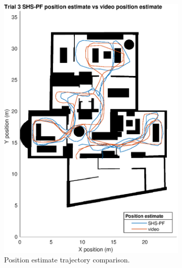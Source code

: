  \begin{figure}[H]
 	\centering
 	\begin{subfigure}[t]{.45\textwidth}
 		\centering
 		\includegraphics[width=1.02\linewidth]{images/20201129_1900_trial_3_map_1}
 		\caption{Position estimate trajectory comparison.}
 		\label{fig:shspf_trial3_on_map}
 	\end{subfigure}
 	\begin{subfigure}[t]{.45\textwidth}
 		\centering

\end{subfigure}
\end{figure}
